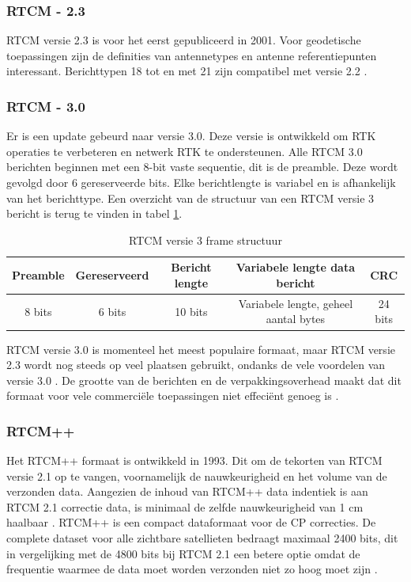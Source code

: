 \subsubsection{RTCM - 2.3}
RTCM versie 2.3 is voor het eerst gepubliceerd in 2001.  Voor geodetische toepassingen zijn de definities van antennetypes en antenne referentiepunten interessant. Berichttypen 18 tot en met 21 zijn compatibel met versie 2.2 \cite{LBibRTCM3}. 

\subsubsection{RTCM - 3.0}
Er is een update gebeurd naar versie 3.0. Deze versie is ontwikkeld om RTK operaties te verbeteren en netwerk RTK te ondersteunen. Alle RTCM 3.0 berichten beginnen met een 8-bit vaste sequentie, dit is de preamble. Deze wordt gevolgd door 6 gereserveerde bits. Elke berichtlengte is variabel en is afhankelijk van het berichttype. Een overzicht van de structuur van een RTCM versie 3 bericht is terug te vinden in tabel \ref{TabRTCM}.

\begin{table}[hbp]
	\caption{RTCM versie 3 frame structuur}		
	\begin{tabular}{|c|c|c|c|c|}	
		\hline
		Preamble & Gereserveerd & Bericht lengte & Variabele lengte data bericht & CRC \\ \hline
		8 bits & 6 bits & 10 bits & Variabele lengte, geheel aantal bytes & 24 bits \\ \hline
	\end{tabular}
	\label{TabRTCM}
\end{table}

RTCM versie 3.0 is momenteel het meest populaire formaat, maar RTCM versie 2.3 wordt nog steeds op veel plaatsen gebruikt, ondanks de vele voordelen van versie 3.0 \cite{LBibRTCM}. De grootte van de berichten en de verpakkingsoverhead maakt dat dit formaat voor vele commerci\"ele toepassingen niet effeci\"ent genoeg is \cite{LBibDGPS}.  

\subsubsection{RTCM++}
Het RTCM++ formaat is ontwikkeld in 1993. Dit om de tekorten van RTCM versie 2.1 op te vangen, voornamelijk de nauwkeurigheid en het volume van de verzonden data. Aangezien de inhoud van RTCM++ data indentiek is aan RTCM 2.1 correctie data, is minimaal de zelfde nauwkeurigheid van 1 cm haalbaar \cite{LBibRTCM3}. RTCM++ is een compact dataformaat voor de CP correcties. De complete dataset voor alle zichtbare satellieten bedraagt maximaal 2400 bits, dit in vergelijking met de 4800 bits bij RTCM 2.1 een betere optie omdat de frequentie waarmee de data moet worden verzonden niet zo hoog moet zijn \cite{LBibRTCM4}. 

